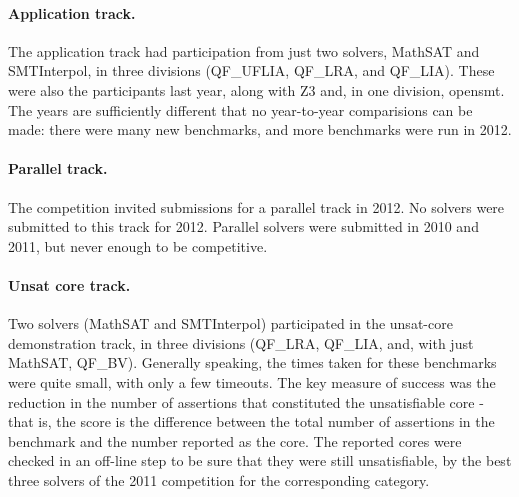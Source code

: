 \documentclass[twosize,11pt]{article}
\begin{document}
\paragraph{Application track.}

The application track had participation from just two solvers, MathSAT and SMTInterpol, in three divisions (QF\_UFLIA, QF\_LRA, and QF\_LIA). These were also the participants last year, along with Z3 and, in one division, opensmt. The years are sufficiently different that no year-to-year comparisions can be made: there were many new benchmarks, and more benchmarks were run in 2012. 

\paragraph{Parallel track.} The competition invited submissions for a parallel track in 2012. No solvers were submitted to this track for 2012.  Parallel solvers were submitted in 2010 and 2011, but never enough to be competitive.

\paragraph{Unsat core track.} Two solvers (MathSAT and SMTInterpol) participated in the unsat-core demonstration track, in three divisions (QF\_LRA, QF\_LIA, and, with just MathSAT, QF\_BV). Generally speaking, the times taken for these benchmarks were quite small, with only a few timeouts. The key measure of success was the reduction in the number of assertions that constituted the unsatisfiable core - that is, the score is the difference between the total number of assertions in the benchmark and the number reported as the core. The reported cores were checked in an off-line step to be sure that they were still unsatisfiable, by the best three solvers of the 2011 competition for
the corresponding category.
\end{document}
